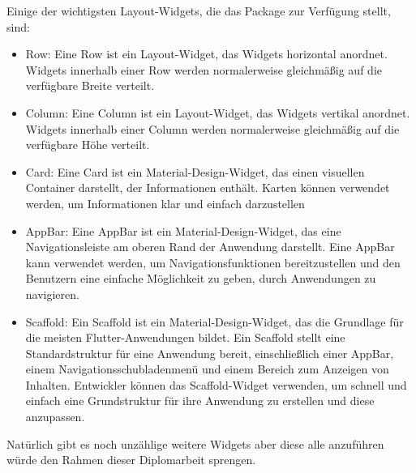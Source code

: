 Einige der wichtigsten Layout-Widgets, die das Package zur Verfügung stellt, sind:
\begin{itemize}
    \item Row: Eine Row ist ein Layout-Widget, das Widgets horizontal anordnet. Widgets innerhalb einer Row werden normalerweise gleichmäßig auf die verfügbare Breite verteilt.
    \item Column: Eine Column ist ein Layout-Widget, das Widgets vertikal anordnet. Widgets innerhalb einer Column werden normalerweise gleichmäßig auf die verfügbare Höhe verteilt.
    \item Card: Eine Card ist ein Material-Design-Widget, das einen visuellen Container darstellt, der Informationen enthält. Karten können verwendet werden, um Informationen klar und einfach darzustellen 
    \item AppBar: Eine AppBar ist ein Material-Design-Widget, das eine Navigationsleiste am oberen Rand der Anwendung darstellt. Eine AppBar kann verwendet werden, um Navigationsfunktionen bereitzustellen und den Benutzern eine einfache Möglichkeit zu geben, durch Anwendungen zu navigieren.
    \item Scaffold: Ein Scaffold ist ein Material-Design-Widget, das die Grundlage für die meisten Flutter-Anwendungen bildet. Ein Scaffold stellt eine Standardstruktur für eine Anwendung bereit, einschließlich einer AppBar, einem Navigationsschubladenmenü und einem Bereich zum Anzeigen von Inhalten. Entwickler können das Scaffold-Widget verwenden, um schnell und einfach eine Grundstruktur für ihre Anwendung zu erstellen und diese anzupassen.
\end{itemize}
Natürlich gibt es noch unzählige weitere Widgets aber diese alle anzuführen würde den Rahmen dieser Diplomarbeit sprengen.




